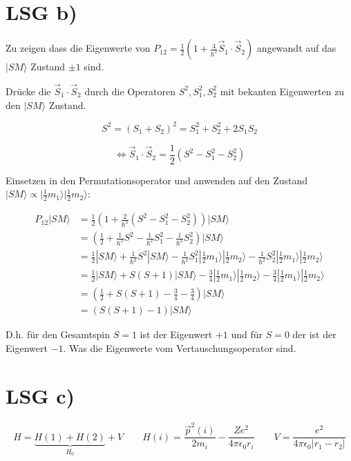\section*{LSG b)}

Zu zeigen dass die Eigenwerte von \(P_{12}= \frac{1}{2}\left( 1+\frac{4}{\hbar^2}\vec S_1\cdot \vec S_2\right) \) angewandt auf das \(|SM\rangle \) Zustand \(\pm 1\) sind. 

Drücke die \(\vec S_1\cdot \vec S_2 \) durch die Operatoren \(S^2,S_1^2,S_2^2\)  mit bekanten Eigenwerten zu den \(|SM\rangle \) Zustand. 

\[S^2 = (S_1+S_2)^2 = S_1^2+S_2^2+2S_1S_2\]  

\[\Leftrightarrow  \vec S_1\cdot \vec S_2 = \frac{1}{2}(S^2-S_1^2-S_2^2) \]

Einsetzen in den Permutationsoperator und anwenden auf den Zustand \(|SM\rangle \propto |\frac{1}{2} m_1\rangle |\frac{1}{2} m_2\rangle \):

\begin{align}
P_{12}|SM\rangle  &= \frac{1}{2}\left( 1+\frac{2}{\hbar^2} (S^2-S_1^2-S_2^2)  \right)|SM\rangle   \\
&= (\frac{1}{2}+\frac{1}{\hbar^2} S^2- \frac{1}{\hbar^2}S_1^2-\frac{1}{\hbar^2}S_2^2) |SM\rangle   \\
&= \frac{1}{2}|SM\rangle +\frac{1}{\hbar^2} S^2|SM\rangle - \frac{1}{\hbar^2}S_1^2|\frac{1}{2} m_1\rangle |\frac{1}{2} m_2\rangle  - \frac{1}{\hbar^2}S_2^2|\frac{1}{2} m_1\rangle|\frac{1}{2} m_2\rangle  \\
&= \frac{1}{2}|SM\rangle + S(S+1) |SM\rangle - \frac{3}{4}|\frac{1}{2} m_1\rangle |\frac{1}{2} m_2\rangle  - \frac{3}{4}|\frac{1}{2} m_1\rangle|\frac{1}{2} m_2\rangle  \\
&= (\frac{1}{2} + S(S+1) - \frac{3}{4}  - \frac{3}{4} ) |SM\rangle  \\
&= (S(S+1) - 1 ) |SM\rangle 
\end{align}

D.h. für den Gesamtspin \(S=1\) ist der Eigenwert \(+1\) und für \(S=0\) der ist der Eigenwert \(-1\). Was die Eigenwerte vom Vertauschungsoperator sind.


\section*{LSG c)}

 

\[H = \underbrace{H(1)+H(2)}_{H_0} + V\qquad H(i)= \frac{\vec p^2(i)}{2m_i} - \frac{Z e^2}{4\pi\epsilon_0r_i} \qquad V = \frac{ e^2}{4\pi\epsilon_0 |r_1-r_2|} \]


